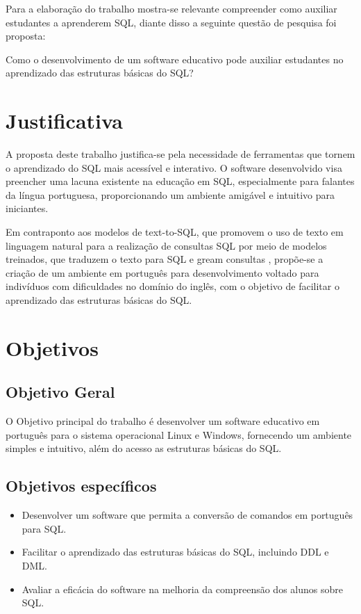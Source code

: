 Para a elaboração do trabalho mostra-se relevante compreender como auxiliar estudantes a aprenderem SQL, diante disso a seguinte questão de pesquisa foi proposta:

Como o desenvolvimento de um software educativo pode auxiliar estudantes no aprendizado das estruturas básicas do SQL?

\section{Justificativa}
A proposta deste trabalho justifica-se pela necessidade de ferramentas que tornem o aprendizado do SQL mais acessível e interativo. O software desenvolvido visa preencher uma lacuna existente na educação em SQL, especialmente para falantes da língua portuguesa, proporcionando um ambiente amigável e intuitivo para iniciantes.

Em contraponto aos modelos de text-to-SQL, que promovem o uso de texto em linguagem natural para a realização de consultas SQL por meio de modelos treinados, que traduzem o texto para SQL e gream consultas \cite{Jose2023}, propõe-se a criação de um ambiente em português para desenvolvimento voltado para indivíduos com dificuldades no domínio do inglês, com o objetivo de facilitar o aprendizado das estruturas básicas do SQL.



\section{Objetivos}
\label{sec:objetivos}

\subsection{Objetivo Geral}

O Objetivo principal do trabalho é desenvolver um software educativo em português para o sistema operacional Linux e Windows, fornecendo um ambiente simples e intuitivo, além do acesso as estruturas básicas do SQL.

\subsection{Objetivos específicos}
\begin{itemize}
    \item Desenvolver um software que permita a conversão de comandos em português para SQL.
    \item Facilitar o aprendizado das estruturas básicas do SQL, incluindo DDL e DML.
    \item Avaliar a eficácia do software na melhoria da compreensão dos alunos sobre SQL.
\end{itemize}

